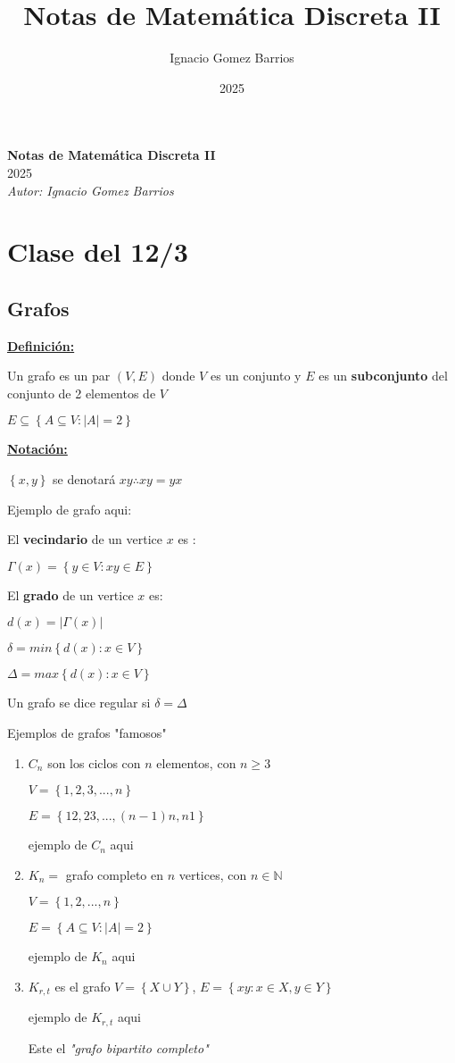\documentclass{article}
\title{Notas de Matemática Discreta II}
\date{2025}
\author{Ignacio Gomez Barrios}
\begin{document}
\newpage

\begin{center}
  \Huge \textbf{Notas de Matemática Discreta II} \\[3cm]
  \Large 2025 \\[4cm]
  \Large \textit{Autor: Ignacio Gomez Barrios}
\end{center}

\newpage

\section*{Clase del 12/3}
\subsection*{Grafos}
\underline{\textbf{Definición:}} 

Un grafo es un par \((V, E)\) donde \(V\) es un conjunto y \(E\) es un \textbf{subconjunto} del conjunto de 2 elementos de \(V\)

\(E \subseteq \left\{A \subseteq V : |A| = 2\right\}\) \bigskip

\underline{\textbf{Notación:}}

\(\left\{x, y\right\}\) se denotará \(xy \therefore xy = yx\)

Ejemplo de grafo aqui: \bigskip

 El \textbf{vecindario} de un vertice \(x\) es :

\(\Gamma(x) = \left\{y \in V : xy \in E\right\}\)

El \textbf{grado} de un vertice \(x\) es:

\(d(x) = |\Gamma(x)|\)

\(\delta = min\left\{d(x) : x \in V\right\}\)

\(\Delta = max\left\{d(x) : x \in V\right\}\)

Un grafo se dice regular si \(\delta = \Delta\) \bigskip

Ejemplos de grafos "famosos"

\begin{enumerate}
\item 

\(C_n\) son los ciclos con \(n\) elementos, con \(n \geq 3\)

\(V = \left\{1, 2, 3, ..., n\right\}\)

\(E = \left\{12, 23, ..., (n-1)n, n1\right\}\)

ejemplo de \(C_n\) aqui

\item
\(K_n = \) grafo completo en \(n\) vertices, con \(n \in \mathbb{N}\) 

\(V = \left\{1, 2, ..., n\right\}\)

\(E = \left\{A \subseteq V : |A| = 2\right\}\)

ejemplo de \(K_n\) aqui

\item
\(K_{r, t} \) es el grafo \(V = \left\{X \cup Y\right\}\), \(E = \left\{xy : x \in X, y \in Y\right\}\) 

ejemplo de \(K_{r, t}\) aqui

Este el \textit{"grafo bipartito completo"}
\end{enumerate}
\bigskip
\end{document}
